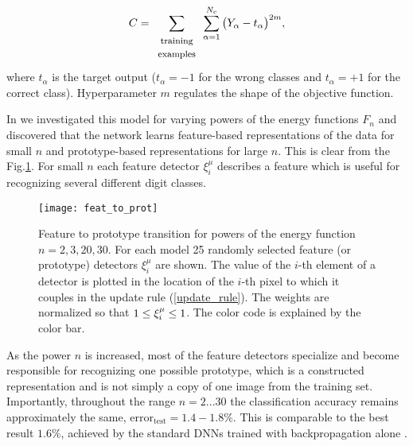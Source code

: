 \documentclass[12pt]{article} %
\begin{document}
\begin{equation}
C=\sum\limits_{\begin{array}{c} \text{\footnotesize{training}}\\ \text{\footnotesize{examples}} \end{array}} \sum\limits_{\alpha=1}^{N_c} \big(Y_\alpha - t_\alpha\big)^{2m}, \label{objective_function}
\end{equation}
where $t_\alpha$ is the target output ($t_\alpha=-1$ for the wrong classes and $t_\alpha=+1$ for the correct class). Hyperparameter $m$ regulates the shape of the objective function.  
    
 In \cite{Krotov Hopfield} we investigated this model for varying powers of the energy functions $F_n$ and discovered that the network learns feature-based representations of the data for small $n$ and prototype-based representations for large $n$. This is clear from the Fig.\ref{feature_to_prototype}. For small $n$ each feature detector $\xi^\mu_i$ describes a feature which is useful for recognizing several different digit classes. 
\begin{figure}[h]
\begin{center}
\texttt{[image: feat\_to\_prot]}
\end{center}
\caption{\footnotesize{Feature to prototype transition for powers of the energy function $n=2, 3, 20, 30$. For each model 25 randomly selected feature (or prototype) detectors $\xi^\mu_i$ are shown. The value of the $i$-th element of a detector is plotted in the location of the $i$-th pixel to which it couples in the update rule (\ref{update_rule}). The weights are normalized so that $\-1\leq \xi^\mu_i \leq 1$. The color code is explained by the color bar. }}\label{feature_to_prototype}
\end{figure}    
As the power $n$ is increased, most of the feature detectors specialize and become responsible for recognizing one possible prototype, which is a constructed representation and is not simply a copy of one image from the training set. Importantly, throughout the range $n=2...30$ the classification accuracy remains approximately the same, $\text{error}_{\text{test}}=1.4 - 1.8\%$. This is comparable to the best result $1.6\%$, achieved by the standard DNNs trained with backpropagation alone \cite{Platt}. 
\end{document}
